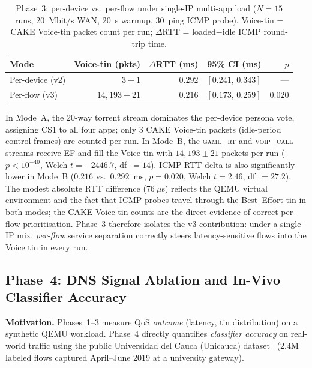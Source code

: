 \documentclass[conference]{IEEEtran}
\begin{document}
\begin{table}[t]
\centering
\caption{Phase~3: per-device vs.\ per-flow under single-IP multi-app load
         ($N{=}15$ runs, 20~Mbit/s WAN, 20~s warmup, 30~ping ICMP probe).
         Voice-tin = CAKE Voice-tin packet count per run;
         $\Delta$RTT = loaded$-$idle ICMP round-trip time.}
\label{tab:phase3}
\begin{tabular}{lrrrr}
\toprule
Mode & Voice-tin (pkts) & $\Delta$RTT (ms) & 95\% CI (ms) & $p$ \\
\midrule
Per-device (v2) & $3 \pm 1$        & $0.292$          & $[0.241,\,0.343]$ & --- \\
Per-flow   (v3) & $14{,}193 \pm 21$ & $0.216$          & $[0.173,\,0.259]$ & $0.020$ \\
\bottomrule
\end{tabular}
\end{table}

In Mode~A, the 20-way torrent stream dominates the per-device persona
vote, assigning CS1 to all four apps; only 3 CAKE Voice-tin packets
(idle-period control frames) are counted per run.
In Mode~B, the \textsc{game\_rt} and \textsc{voip\_call} streams receive EF
and fill the Voice tin with $14{,}193 \pm 21$ packets per run ($p < 10^{-40}$,
Welch $t = -2446.7$, df~$=14$).
ICMP RTT delta is also significantly lower in Mode~B
($0.216$ vs.\ $0.292$~ms, $p = 0.020$, Welch $t = 2.46$, df~$=27.2$).
The modest absolute RTT difference ($76~\mu$s) reflects the QEMU virtual
environment and the fact that ICMP probes travel through the Best~Effort tin
in both modes; the CAKE Voice-tin counts are the direct evidence of correct
per-flow prioritisation.
Phase~3 therefore isolates the v3 contribution: under a single-IP
mix, \emph{per-flow} service separation correctly steers latency-sensitive
flows into the Voice tin in every run.

\subsection{Phase~4: DNS Signal Ablation and In-Vivo Classifier Accuracy}
\label{subsec:invivo}

\textbf{Motivation.}
Phases~1--3 measure QoS \emph{outcome} (latency, tin distribution) on a
synthetic QEMU workload.
Phase~4 directly quantifies \emph{classifier accuracy} on real-world traffic
using the public Universidad del Cauca (Unicauca) dataset~\cite{unicauca2019}
(2.4M labeled flows captured April--June 2019 at a university gateway).
\end{document}
